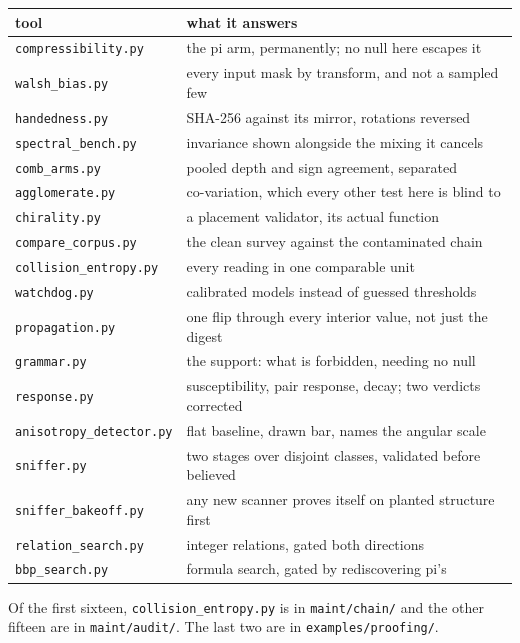 \begin{center}
\begin{tabular}{@{}ll@{}}
\toprule
tool & what it answers \\
\midrule
\texttt{compressibility.py} & the pi arm, permanently; no null here escapes it \\
\texttt{walsh\_bias.py} & every input mask by transform, and not a sampled few \\
\texttt{handedness.py} & SHA-256 against its mirror, rotations reversed \\
\texttt{spectral\_bench.py} & invariance shown alongside the mixing it cancels \\
\texttt{comb\_arms.py} & pooled depth and sign agreement, separated \\
\texttt{agglomerate.py} & co-variation, which every other test here is blind to \\
\texttt{chirality.py} & a placement validator, its actual function \\
\texttt{compare\_corpus.py} & the clean survey against the contaminated chain \\
\texttt{collision\_entropy.py} & every reading in one comparable unit \\
\texttt{watchdog.py} & calibrated models instead of guessed thresholds \\
\texttt{propagation.py} & one flip through every interior value, not just the digest \\
\texttt{grammar.py} & the support: what is forbidden, needing no null \\
\texttt{response.py} & susceptibility, pair response, decay; two verdicts corrected \\
\texttt{anisotropy\_detector.py} & flat baseline, drawn bar, names the angular scale \\
\texttt{sniffer.py} & two stages over disjoint classes, validated before believed \\
\texttt{sniffer\_bakeoff.py} & any new scanner proves itself on planted structure first \\
\texttt{relation\_search.py} & integer relations, gated both directions \\
\texttt{bbp\_search.py} & formula search, gated by rediscovering pi's \\
\bottomrule
\end{tabular}
\end{center}

Of the first sixteen, \texttt{collision\_entropy.py} is in \texttt{maint/\allowbreak{}chain/} and the other fifteen are in \texttt{maint/\allowbreak{}audit/}. The last two are in \texttt{examples/\allowbreak{}proofing/}.

